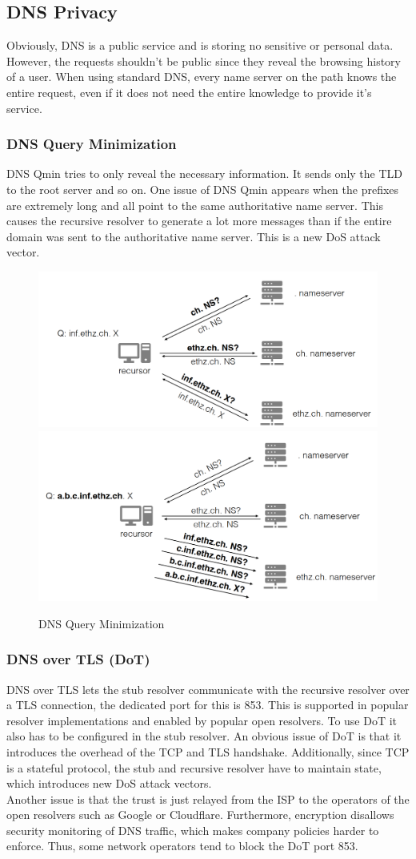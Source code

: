 \subsection{DNS Privacy}
Obviously, DNS is a public service and is storing no sensitive or personal data. However, the requests shouldn't be public since they reveal the browsing history of a user. When using standard DNS, every name server on the path knows the entire request, even if it does not need the entire knowledge to provide it's service.

\subsubsection{DNS Query Minimization}
DNS Qmin tries to only reveal the necessary information. It sends only the TLD to the root server and so on. 
One issue of DNS Qmin appears when the prefixes are extremely long and all point to the same authoritative name server. This causes the recursive resolver to generate a lot more messages than if the entire domain was sent to the authoritative name server. This is a new DoS attack vector.
\begin{figure}[H]
\centering
\includegraphics[width=.49\textwidth]{images/qmin.PNG}
\includegraphics[width=.49\textwidth]{images/qmin_dos.PNG}
\caption{DNS Query Minimization}
\label{qmin}
\end{figure}

\subsubsection{DNS over TLS (DoT)}
DNS over TLS lets the stub resolver communicate with the recursive resolver over a TLS connection, the dedicated port for this is 853. This is supported in popular resolver implementations and enabled by popular open resolvers. To use DoT it also has to be configured in the stub resolver. An obvious issue of DoT is that it introduces the overhead of the TCP and TLS handshake. Additionally, since TCP is a stateful protocol, the stub and recursive resolver have to maintain state, which introduces new DoS attack vectors.\\
Another issue is that the trust is just relayed from the ISP to the operators of the open resolvers such as Google or Cloudflare. Furthermore, encryption disallows security monitoring of DNS traffic, which makes company policies harder to enforce. Thus, some network operators tend to block the DoT port 853.

